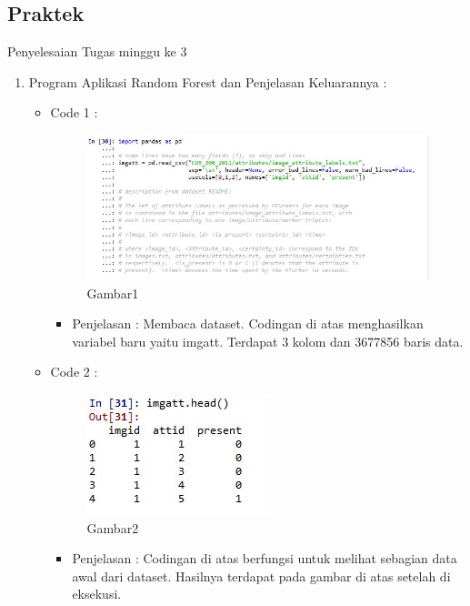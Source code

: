 \subsection{Praktek}
Penyelesaian Tugas minggu ke 3
\begin{enumerate}
\item Program Aplikasi Random Forest dan Penjelasan Keluarannya :
\begin{itemize}
\item Code 1 :
\par
\begin{figure}[ht]
\centering
\includegraphics[scale=0.7]{figures/pd1.jpg}
\caption{Gambar1}
\label{contoh}
\end{figure}
\par
\begin{itemize}
\item Penjelasan : Membaca dataset. Codingan di atas menghasilkan variabel baru yaitu imgatt. Terdapat 3 kolom dan 3677856 baris data.
\par 
\par
\end{itemize}
\item Code 2 :
\par
\begin{figure}[ht]
\centering
\includegraphics[scale=0.7]{figures/pd2.jpg}
\caption{Gambar2}
\label{contoh}
\end{figure}
\par
\begin{itemize}
\item Penjelasan : Codingan di atas berfungsi untuk melihat sebagian data awal dari dataset. Hasilnya terdapat pada gambar di atas setelah di eksekusi.

\end{itemize}
\end{itemize}
\end{enumerate}
